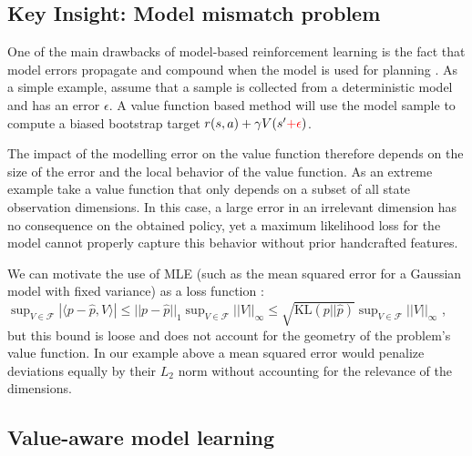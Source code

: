 \subsection{Key Insight: Model mismatch problem}

One of the main drawbacks of model-based reinforcement learning is the fact that model errors propagate and compound when the model is used for planning \parencite{schneider1997exploiting,kearns2002near,talvitie2017self}.
As a simple example, assume that a sample is collected from a deterministic model and has an error $\epsilon$.
A value function based method will use the model sample to compute a biased bootstrap target
$
r(s,a) + \gamma V(s' {\color{red} + \epsilon})
$.

The impact of the modelling error on the value function therefore depends on the size of the error and the local behavior of the value function. 
As an extreme example take a value function that only depends on a subset of all state observation dimensions. 
In this case, a large error in an irrelevant dimension has no consequence on the obtained policy, yet a maximum likelihood loss for the model cannot properly capture this behavior without prior handcrafted features.

We can motivate the use of MLE (such as the mean squared error for a Gaussian model with fixed variance) as a loss function :%
~$\sup_{V \in \mathcal{F}}|\langle p - \hat{p}, V\rangle|\leq ||p - \hat{p}||_1 \sup_{V \in \mathcal{F}}||V||_\infty \leq \sqrt{\text{KL}(p||\hat{p})}\sup_{V \in \mathcal{F}}||V||_\infty$
\parencite{vaml}, but this bound is loose and does not account for the geometry of the problem's value function. 
In our example above a mean squared error would penalize deviations equally by their $L_2$ norm without accounting for the relevance of the dimensions.

\subsection{Value-aware model learning}

